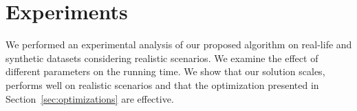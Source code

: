 \section{Experiments}
\label{sec:experiments}



We performed an experimental analysis of our proposed algorithm on real-life and synthetic datasets considering realistic scenarios. We  examine the effect of different parameters on the running time. 
We show that our solution scales, performs well on realistic scenarios and that the optimization presented in Section~\ref{sec:optimizations} are effective. 
 
